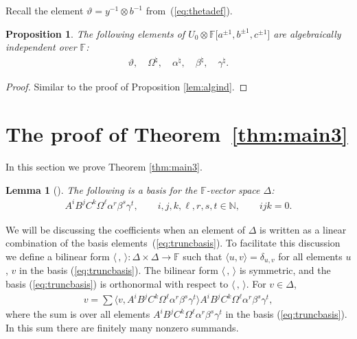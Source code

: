 \documentclass[11pt]{article}
\numberwithin{equation}{section}
\newtheorem{Lemma}[Theorem]{Lemma}
\newtheorem{Proposition}[Theorem]{Proposition}
{\theoremstyle{definition}
\newtheorem{Note}[Theorem]{Note}
\newtheorem{Definition}[Theorem]{Definition}
\newtheorem{Problem}[Theorem]{Problem}
}
\begin{document}
 Recall the element
$\vartheta = y^{-1} \otimes b^{-1}$ from~(\ref{eq:thetadef}).

\begin{Proposition}
\label{lem:algind2}
The following elements of
$U_0\otimes
\mathbb F \lbrack a^{\pm 1}, b^{\pm 1}, c^{\pm 1}\rbrack $
are algebraically independent over $\mathbb F$:
\begin{gather*}
\vartheta, \quad \Omega^\natural,
\quad
\alpha^\natural,
\quad
\beta^\natural,
\quad
\gamma^\natural.
\end{gather*}
\end{Proposition}
\begin{proof}
Similar to the proof of
Proposition
\ref{lem:algind}.
\end{proof}


\section{The proof of Theorem~\ref{thm:main3}}\label{section9}

In this section we prove
Theorem
\ref{thm:main3}.

\begin{Lemma}[]
\label{lem:altbasisdelta}
The following is a basis for the $\mathbb F$-vector space
$\Delta$:
\begin{gather}
A^iB^jC^k\Omega^\ell \alpha^r \beta^s \gamma^t, \qquad
i,j,k,\ell, r,s,t\in \mathbb N,
\qquad   ijk=0.
\label{eq:truncbasis}
\end{gather}
\end{Lemma}


 We will be discussing
 the coef\/f\/icients
when an element of $\Delta$ is written as a linear
combination of the basis elements~(\ref{eq:truncbasis}). To facilitate this discussion
we def\/ine a bilinear form
$\langle \,,\,\rangle : \Delta \times \Delta \to \mathbb F$
such that $\langle u,v\rangle = \delta_{u,v}$
for all elements $u$, $v$ in the basis
(\ref{eq:truncbasis}). The bilinear form
$\langle\,,\,\rangle$ is symmetric, and
the basis
(\ref{eq:truncbasis}) is
orthonormal with respect to
$\langle \,,\, \rangle $.
For $v \in \Delta$,
\begin{gather*}
v = \sum \langle v, A^iB^jC^k\Omega^\ell\alpha^r\beta^s\gamma^t \rangle
 A^iB^jC^k\Omega^\ell\alpha^r\beta^s\gamma^t,
\label{eq:truncbilsum}
\end{gather*}
where the sum is over all elements
 $A^iB^jC^k\Omega^\ell\alpha^r\beta^s\gamma^t$ in the basis
(\ref{eq:truncbasis}). In this sum there are f\/initely
many nonzero summands.
\end{document}

